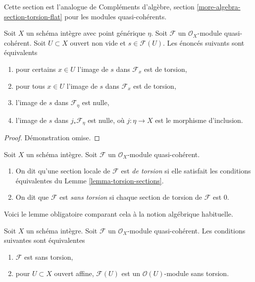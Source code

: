 \noindent
Cette section est l'analogue de Compléments d'algèbre, section  \ref{more-algebra-section-torsion-flat}  pour les
modules quasi-cohérents.

\begin{lemma}
\label{lemma-torsion-sections}
Soit  $X$  un schéma intègre avec point générique  $\eta$. Soit
 $\mathcal{F}$  un  $\mathcal{O}_X$-module quasi-cohérent. Soit  $U \subset X$  ouvert non
vide et  $s \in \mathcal{F}(U)$. Les énoncés suivants sont équivalents
\begin{enumerate}
\item pour certains  $x \in U$  l'image de  $s$  dans  $\mathcal{F}_x$  est de
torsion,
\item pour tous  $x \in U$  l'image de  $s$  dans  $\mathcal{F}_x$  est de torsion,
\item l'image de  $s$  dans  $\mathcal{F}_\eta$  est nulle,
\item l'image de  $s$  dans  $j_*\mathcal{F}_\eta$  est nulle, où  $j : \eta \to X$  est le
morphisme d'inclusion.
\end{enumerate}
\end{lemma}

\begin{proof}
Démonstration omise.
\end{proof}

\begin{definition}
\label{definition-torsion}
Soit  $X$  un schéma intègre. Soit  $\mathcal{F}$  un  $\mathcal{O}_X$-module
quasi-cohérent.
\begin{enumerate}
\item On dit qu'une section locale de  $\mathcal{F}$  est  {\it 
de torsion}  si elle satisfait les conditions équivalentes du Lemme
 \ref{lemma-torsion-sections}.
\item On dit que  $\mathcal{F}$  est  {\it  sans torsion}  si
chaque section de torsion de  $\mathcal{F}$  est  $0$.
\end{enumerate}
\end{definition}

\noindent
Voici le lemme obligatoire comparant cela à la notion algébrique habituelle.

\begin{lemma}
\label{lemma-check-torsion-on-affines}
Soit  $X$  un schéma intègre. Soit  $\mathcal{F}$  un  $\mathcal{O}_X$-module
quasi-cohérent. Les conditions suivantes sont équivalentes
\begin{enumerate}
\item $\mathcal{F}$  est sans torsion,
\item pour  $U \subset X$  ouvert affine,  $\mathcal{F}(U)$  est un  $\mathcal{O}(U)$-module sans
torsion.
\end{enumerate}
\end{lemma}

